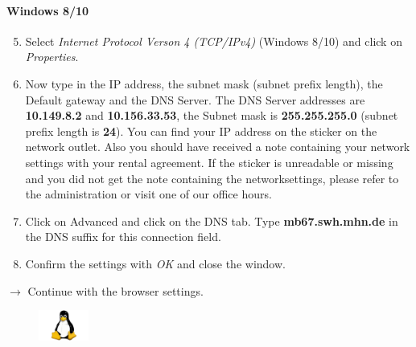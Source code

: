 \documentclass[a4paper,12pt]{scrartcl}
\begin{document}
\paragraph*{Windows 8/10}
\begin{enumerate}
    \setcounter{enumi}{4}
	\item Select \emph{Internet Protocol Verson 4 (TCP/IPv4)} (Windows 8/10) and click on \emph{Properties}.
    \item Now type in the IP address, the subnet mask (subnet prefix length), the Default gateway and the DNS Server. The DNS Server addresses are \textbf{10.149.8.2} and \textbf{10.156.33.53}, the Subnet mask is \textbf{255.255.255.0} (subnet prefix length is \textbf{24}). You can find your IP address on the sticker on the network outlet. Also you should have received a note containing your network settings with your rental agreement. If the sticker is unreadable or missing and you did not get the note containing the networksettings, please refer to the administration or visit one of our office hours.
    \item Click on Advanced and click on the DNS tab. Type \textbf{mb67.swh.mhn.de} in the DNS suffix for this connection field.
	\item Confirm the settings with \emph{OK} and close the window.
\end{enumerate}
$\rightarrow$ Continue with the browser settings.


\pagebreak

\begin{figure}[t!]
    \raggedleft
    \vspace{-20pt}
    \includegraphics[height=1cm,keepaspectratio]{Bilder/linux_logo_neu}
    \vspace{-30pt}
\end{figure}
\end{document}

